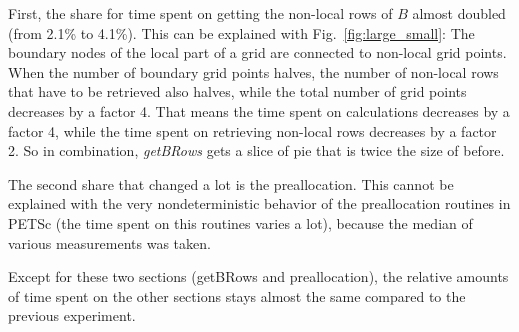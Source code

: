First, the share for time spent on getting the non-local rows of $B$ almost doubled (from 2.1\% to 4.1\%). This can be explained with Fig.~\ref{fig:large_small}: The boundary nodes of the local part of a grid are connected to non-local grid points. When the number of boundary grid points halves, the number of non-local rows that have to be retrieved also halves, while the total number of grid points decreases by a factor 4. That means the time spent on calculations decreases by a factor 4, while the time spent on retrieving non-local rows decreases by a factor 2. So in combination, \textit{getBRows} gets a slice of pie that is twice the size of before. 

The second share that changed a lot is the preallocation. This cannot be explained with the very nondeterministic behavior of the preallocation routines in PETSc (the time spent on this routines varies a lot), because the median of various measurements was taken. 

Except for these two sections (getBRows and preallocation), the relative amounts of time spent on the other sections stays almost the same compared to the previous experiment.

